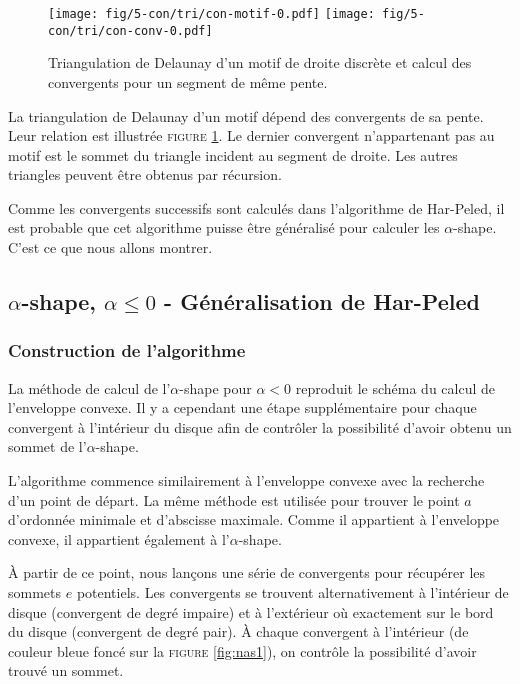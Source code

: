 \begin{figure}[H]
  \centering
  \texttt{[image: fig/5-con/tri/con-motif-0.pdf]}
  \texttt{[image: fig/5-con/tri/con-conv-0.pdf]}
  \caption{Triangulation de Delaunay d'un motif de droite discrète et calcul des convergents pour un segment de même pente.}
\label{fig:tri}   
\end{figure}

La triangulation de Delaunay d'un motif dépend des convergents de sa pente. Leur relation est illustrée \textsc{figure} \ref{fig:tri}. Le dernier convergent n'appartenant pas au motif est le sommet du triangle incident au segment de droite. Les autres triangles peuvent être obtenus par récursion. 

Comme les convergents successifs sont calculés dans l’algorithme de Har-Peled, il est probable que cet algorithme puisse être généralisé pour calculer les $\alpha$-shape. C'est ce que nous allons montrer.  

\subsection{$\alpha$-shape, $\alpha \leq 0$ - Généralisation de Har-Peled}

\subsubsection{Construction de l'algorithme}

La méthode de calcul de l'$\alpha$-shape pour $\alpha <0$ reproduit le schéma du calcul de l’enveloppe convexe. Il y a cependant une étape supplémentaire pour chaque convergent à l'intérieur du disque afin de contrôler la possibilité d'avoir obtenu un sommet de l'$\alpha$-shape.

L'algorithme commence similairement à l'enveloppe convexe avec la recherche d'un point de départ. La même méthode est utilisée pour trouver le point $a$ d'ordonnée minimale et d'abscisse maximale. Comme il appartient à l'enveloppe convexe, il appartient également à l'$\alpha$-shape.

À partir de ce point, nous lançons une série de convergents pour récupérer les sommets $e$ potentiels. Les convergents se trouvent alternativement à l'intérieur de disque (convergent de degré impaire) et à l'extérieur où exactement sur le bord du disque (convergent de degré pair). À chaque convergent à l'intérieur (de couleur bleue foncé sur la \textsc{figure} \ref{fig:nas1}), on contrôle la possibilité d'avoir trouvé un sommet.

